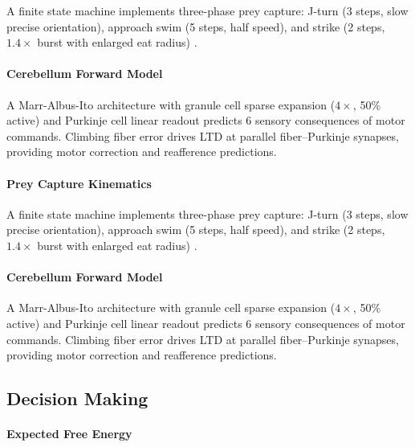 \documentclass[12pt]{article}
\begin{document}
A finite state machine implements three-phase prey capture:
J-turn (3 steps, slow precise orientation), approach swim
(5 steps, half speed), and strike (2 steps, $1.4\times$ burst
with enlarged eat radius) \citep{bianco2015}.

\paragraph{Cerebellum Forward Model}

A Marr-Albus-Ito architecture with granule cell sparse expansion
($4\times$, 50\% active) and Purkinje cell linear readout predicts
6 sensory consequences of motor commands.
Climbing fiber error drives LTD at parallel fiber--Purkinje synapses,
providing motor correction and reafference predictions.

\paragraph{Prey Capture Kinematics}

A finite state machine implements three-phase prey capture:
J-turn (3 steps, slow precise orientation), approach swim
(5 steps, half speed), and strike (2 steps, $1.4\times$ burst
with enlarged eat radius) \citep{bianco2015}.

\paragraph{Cerebellum Forward Model}

A Marr-Albus-Ito architecture with granule cell sparse expansion
($4\times$, 50\% active) and Purkinje cell linear readout predicts
6 sensory consequences of motor commands.
Climbing fiber error drives LTD at parallel fiber--Purkinje synapses,
providing motor correction and reafference predictions.

\subsection{Decision Making}\label{sec:decision}

\paragraph{Expected Free Energy}
\end{document}
